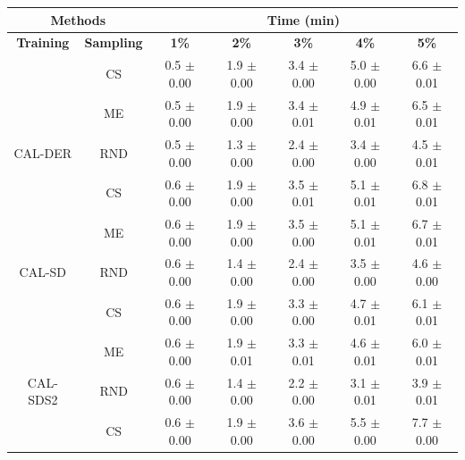 \begin{table}[htbp]
\centering

\begin{tabular*}{\linewidth}{c|c|@{\extracolsep{\fill}}ccccc}
\toprule
\multicolumn{2}{c|}{\textbf{Methods}} & \multicolumn{5}{c}{\textbf{Time (min)}} \\
\midrule
\textbf{Training} & \textbf{Sampling} & \textbf{1\%} & \textbf{2\%} & \textbf{3\%} & \textbf{4\%} & \textbf{5\%}\\
\midrule
 & CS & 0.5 $\pm$ {\small 0.00} & 1.9 $\pm$ {\small 0.00} & 3.4 $\pm$ {\small 0.00} & 5.0 $\pm$ {\small 0.00} & 6.6 $\pm$ {\small 0.01}\\

 & ME & 0.5 $\pm$ {\small 0.00} & 1.9 $\pm$ {\small 0.00} & 3.4 $\pm$ {\small 0.01} & 4.9 $\pm$ {\small 0.01} & 6.5 $\pm$ {\small 0.01}\\

\multirow{-3}{*}{\raggedright\arraybackslash CAL-DER} & RND & 0.5 $\pm$ {\small 0.00} & 1.3 $\pm$ {\small 0.00} & 2.4 $\pm$ {\small 0.00} & 3.4 $\pm$ {\small 0.00} & 4.5 $\pm$ {\small 0.01}\\
\midrule
 & CS & 0.6 $\pm$ {\small 0.00} & 1.9 $\pm$ {\small 0.00} & 3.5 $\pm$ {\small 0.01} & 5.1 $\pm$ {\small 0.01} & 6.8 $\pm$ {\small 0.01}\\

 & ME & 0.6 $\pm$ {\small 0.00} & 1.9 $\pm$ {\small 0.00} & 3.5 $\pm$ {\small 0.00} & 5.1 $\pm$ {\small 0.01} & 6.7 $\pm$ {\small 0.01}\\

\multirow{-3}{*}{\raggedright\arraybackslash CAL-SD} & RND & 0.6 $\pm$ {\small 0.00} & 1.4 $\pm$ {\small 0.00} & 2.4 $\pm$ {\small 0.00} & 3.5 $\pm$ {\small 0.00} & 4.6 $\pm$ {\small 0.00}\\
\midrule
 & CS & 0.6 $\pm$ {\small 0.00} & 1.9 $\pm$ {\small 0.00} & 3.3 $\pm$ {\small 0.00} & 4.7 $\pm$ {\small 0.01} & 6.1 $\pm$ {\small 0.01}\\

 & ME & 0.6 $\pm$ {\small 0.00} & 1.9 $\pm$ {\small 0.01} & 3.3 $\pm$ {\small 0.01} & 4.6 $\pm$ {\small 0.01} & 6.0 $\pm$ {\small 0.01}\\

\multirow{-3}{*}{\raggedright\arraybackslash CAL-SDS2} & RND & 0.6 $\pm$ {\small 0.00} & 1.4 $\pm$ {\small 0.00} & 2.2 $\pm$ {\small 0.00} & 3.1 $\pm$ {\small 0.01} & 3.9 $\pm$ {\small 0.01}\\
\midrule
 & CS & 0.6 $\pm$ {\small 0.00} & 1.9 $\pm$ {\small 0.00} & 3.6 $\pm$ {\small 0.00} & 5.5 $\pm$ {\small 0.00} & 7.7 $\pm$ {\small 0.00}\\


\end{tabular*}
\end{table}
